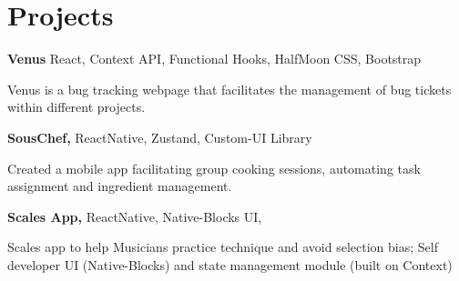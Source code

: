 
\newenvironment{twocolentry_proj}[2][]{
    \onecolentry
    \def\secondColumn{#2}
    \setcolumnwidth{\fill, 6.2 cm}
    \begin{paracol}{2}
}{
    \switchcolumn \raggedleft \secondColumn
    \end{paracol}
    \endonecolentry
} %

\vspace{5 pt - 0.5 cm}
\section{Projects}
\begin{twocolentry_proj}{
    \mbox{}%
}
\textbf{Venus} React, Context API, Functional Hooks, HalfMoon CSS, Bootstrap
\end{twocolentry_proj}

\begin{onecolentry}
    \begin{highlights}
        \item Venus is a bug tracking webpage that facilitates the management of bug tickets within different projects. 
    \end{highlights}
\end{onecolentry}

\vspace{0.10 cm}
\begin{twocolentry_proj}{
    \mbox{}%
}
\textbf{SousChef,} ReactNative, Zustand, Custom-UI Library  
\end{twocolentry_proj}
\begin{onecolentry}
    \begin{highlights}
        \item Created a mobile app facilitating group cooking sessions, automating task assignment and ingredient management.
    \end{highlights}
\end{onecolentry}

\vspace{0.10 cm}
\begin{twocolentry_proj}{
    \mbox{}%
}
\textbf{Scales App,} ReactNative, Native-Blocks UI, 
\end{twocolentry_proj}
\begin{onecolentry}
    \begin{highlights}
        \item Scales app to help Musicians practice technique and avoid selection bias; Self developer UI (Native-Blocks) and state management module (built on Context)
    \end{highlights}
\end{onecolentry}